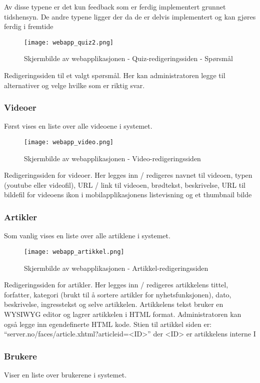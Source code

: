 \documentclass[../main.tex]{subfiles}
\begin{document}
Av disse typene er det kun feedback som er ferdig implementert grunnet tidshensyn. De andre typene ligger der da de er delvis implementert og kan gjøres ferdig i fremtide

\begin{figure}[H]
  \centering
  \texttt{[image: webapp\_quiz2.png]}
  \caption{Skjermbilde av webapplikasjonen - Quiz-redigeringssiden - Spørsmål}
\end{figure}

Redigeringssiden til et valgt spørsmål. Her kan administratoren legge til alternativer og velge hvilke som er riktig svar.


\subsubsection{Videoer}
Først vises en liste over alle videoene i systemet.

\begin{figure}[H]
  \centering
  \texttt{[image: webapp\_video.png]}
  \caption{Skjermbilde av webapplikasjonen - Video-redigeringssiden}
\end{figure}

Redigeringssiden for videoer. Her legges inn / redigeres navnet til videoen, typen (youtube eller videofil), URL / link til videoen, brødtekst, beskrivelse, URL til bildefil for videoens ikon i mobilapplikasjonens listevisning og et thumbnail bilde


\subsubsection{Artikler}
Som vanlig vises en liste over alle artiklene i systemet.

\begin{figure}[H]
  \centering
  \texttt{[image: webapp\_artikkel.png]}
  \caption{Skjermbilde av webapplikasjonen - Artikkel-redigeringssiden}
\end{figure}

Redigeringssiden for artikler. Her legges inn / redigeres artikkelens tittel, forfatter, kategori (brukt til å sortere artikler for nyhetsfunksjonen), dato, beskrivelse, ingresstekst og selve artikkelen. Artikkelens tekst bruker en WYSIWYG editor og lagrer artikkelen i HTML format. Administratoren kan også legge inn egendefinerte HTML kode. Stien til artikkel siden er: “server.no/faces/article.xhtml?articleid=<ID>” der <ID> er artikkelens interne I


\subsubsection{Brukere}
Viser en liste over brukerene i systemet.
\end{document}
